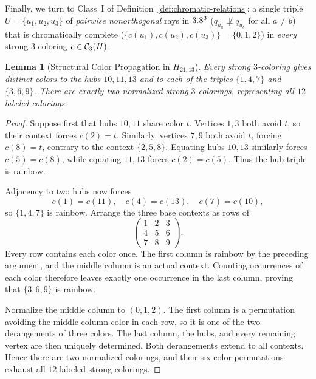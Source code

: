 \documentclass[aps,pra,reprint,superscriptaddress,longbibliography,nofootinbib,floatfix,10pt]{revtex4-2}
\newtheorem{lemma}[theorem]{Lemma}
\theoremstyle{definition}\newtheorem{definition}[theorem]{Definition}
\theoremstyle{remark}\newtheorem{remark}[theorem]{Remark}
\begin{document}
Finally, we turn to Class~I of Definition~\ref{def:chromatic-relations}: a single triple $U=\{u_1,u_2,u_3\}$ of \emph{pairwise nonorthogonal} rays in $3.8^3$ ($q_{u_a}\not\perp q_{u_b}$ for all $a\neq b$) that is chromatically complete ($\{c(u_1),c(u_2),c(u_3)\}=\{0,1,2\}$) in \emph{every} strong $3$-coloring $c\in\mathcal C_3(H)$.

\begin{lemma}[Structural Color Propagation in $H_{21,13}$]\label{lem:H21-structural}
Every strong $3$-coloring gives distinct colors to the hubs $10,11,13$ and to each of the triples $\{1,4,7\}$ and $\{3,6,9\}$. There are exactly two normalized strong $3$-colorings, representing all $12$ labeled colorings.
\end{lemma}
\begin{proof}
Suppose first that hubs $10,11$ share color $t$. Vertices $1,3$ both avoid $t$, so their context forces $c(2)=t$. Similarly, vertices $7,9$ both avoid $t$, forcing $c(8)=t$, contrary to the context $\{2,5,8\}$. Equating hubs $10,13$ similarly forces $c(5)=c(8)$, while equating $11,13$ forces $c(2)=c(5)$. Thus the hub triple is rainbow.

Adjacency to two hubs now forces
\[
c(1)=c(11),\quad c(4)=c(13),\quad c(7)=c(10),
\]
so $\{1,4,7\}$ is rainbow. Arrange the three base contexts as rows of
\[
\begin{pmatrix}1&2&3\\4&5&6\\7&8&9\end{pmatrix}.
\]
Every row contains each color once. The first column is rainbow by the preceding argument, and the middle column is an actual context. Counting occurrences of each color therefore leaves exactly one occurrence in the last column, proving that $\{3,6,9\}$ is rainbow.

Normalize the middle column to $(0,1,2)$. The first column is a permutation avoiding the middle-column color in each row, so it is one of the two derangements of three colors. The last column, the hubs, and every remaining vertex are then uniquely determined. Both derangements extend to all contexts. Hence there are two normalized colorings, and their six color permutations exhaust all $12$ labeled strong colorings.
\end{proof}
\end{document}
